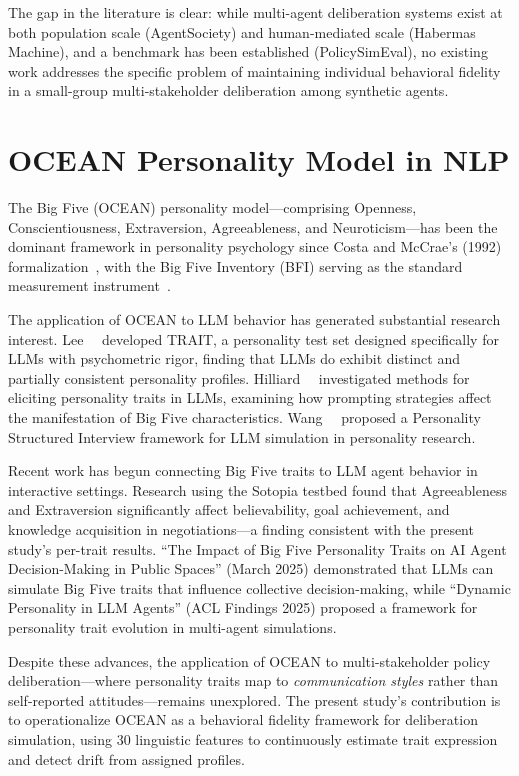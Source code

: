 The gap in the literature is clear: while multi-agent deliberation systems exist at both population scale (AgentSociety) and human-mediated scale (Habermas Machine), and a benchmark has been established (PolicySimEval), no existing work addresses the specific problem of maintaining individual behavioral fidelity in a small-group multi-stakeholder deliberation among synthetic agents.


\section{OCEAN Personality Model in NLP}

The Big Five (OCEAN) personality model---comprising Openness, Conscientiousness, Extraversion, Agreeableness, and Neuroticism---has been the dominant framework in personality psychology since Costa and McCrae's (1992) formalization~\cite{costa1992neo}, with the Big Five Inventory (BFI) serving as the standard measurement instrument~\cite{john1999bigfive}.

The application of OCEAN to LLM behavior has generated substantial research interest. Lee~\etal~\cite{lee2025trait} developed TRAIT, a personality test set designed specifically for LLMs with psychometric rigor, finding that LLMs do exhibit distinct and partially consistent personality profiles. Hilliard~\etal~\cite{hilliard2024eliciting} investigated methods for eliciting personality traits in LLMs, examining how prompting strategies affect the manifestation of Big Five characteristics. Wang~\etal~\cite{wang2025psi} proposed a Personality Structured Interview framework for LLM simulation in personality research.

Recent work has begun connecting Big Five traits to LLM agent behavior in interactive settings. Research using the Sotopia testbed found that Agreeableness and Extraversion significantly affect believability, goal achievement, and knowledge acquisition in negotiations---a finding consistent with the present study's per-trait results. ``The Impact of Big Five Personality Traits on AI Agent Decision-Making in Public Spaces'' (March 2025) demonstrated that LLMs can simulate Big Five traits that influence collective decision-making, while ``Dynamic Personality in LLM Agents'' (ACL Findings 2025) proposed a framework for personality trait evolution in multi-agent simulations.

Despite these advances, the application of OCEAN to multi-stakeholder policy deliberation---where personality traits map to \textit{communication styles} rather than self-reported attitudes---remains unexplored. The present study's contribution is to operationalize OCEAN as a behavioral fidelity framework for deliberation simulation, using 30 linguistic features to continuously estimate trait expression and detect drift from assigned profiles.


